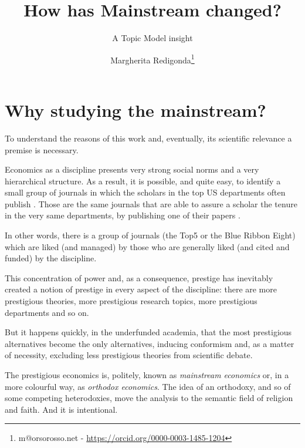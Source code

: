 \documentclass[a4paper, 11pt, headings=standardclasses, tablecaptionsbelow]{scrartcl}
\title{How has Mainstream changed? \let\thefootnote\relax\footnotetext{
  This version is intended to be submitted to the XV ESHET Conference
  
  An updated version of this paper and all the source code and the instructions required to replicate the paper are available at \url{https://github.com/TnTo/mainstream/}
}}
\subtitle{A Topic Model insight}
\author{Margherita Redigonda\thanks{m@orsorosso.net - \url{https://orcid.org/0000-0003-1485-1204}}}
\begin{document}
\maketitle


\section{Why studying the mainstream?}
To understand the reasons of this work and, eventually, its scientific relevance a premise is necessary.

Economics as a discipline presents very strong social norms and a very hierarchical structure.
As a result, it is possible, and quite easy, to identify a small group of journals in which the scholars in the top US departments often publish \parencite{card2013,kim2006,kim2009,dusansky1998,hamermesh2013,ellison2003,heck2006}.
Those are the same journals that are able to assure a scholar the tenure in the very same departments, by publishing one of their papers \parencite{heckman2020}.

In other words, there is a group of journals (the Top5 or the Blue Ribbon Eight) which are liked (and managed) by those who are generally liked (and cited and funded) by the discipline.

This concentration of power and, as a consequence, prestige has inevitably created a notion of prestige in every aspect of the discipline: there are more prestigious theories, more prestigious research topics, more prestigious departments and so on.

But it happens quickly, in the underfunded academia, that the most prestigious alternatives become the only alternatives, inducing conformism and, as a matter of necessity, excluding less prestigious theories from scientific debate.

The prestigious economics is, politely, known as \textit{mainstream economics} or, in a more colourful way, as \textit{orthodox economics}. The idea of an orthodoxy, and so of some competing heterodoxies, move the analysis to the semantic field of religion and faith. And it is intentional.
\end{document}
